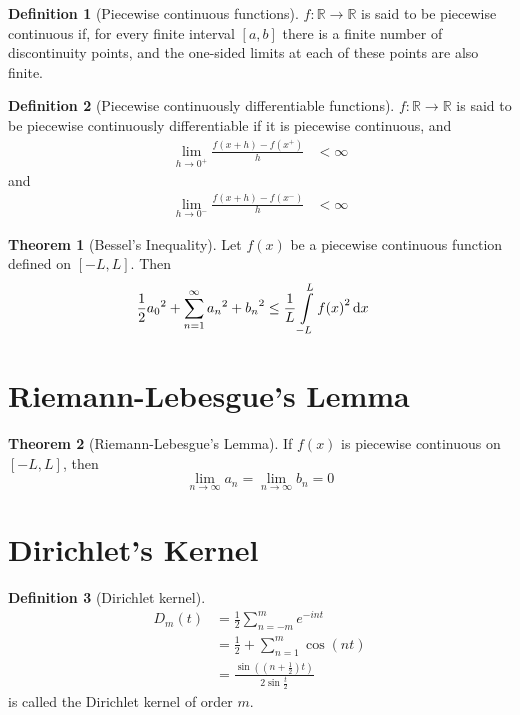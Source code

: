 \documentclass[fleqn, a4paper, 12pt, twoside]{article}
\theoremstyle{definition}
\newtheorem{definition}{Definition}
\theoremstyle{theorem}
\newtheorem{theorem}{Theorem}
\begin{document}
\begin{definition}[Piecewise continuous functions]
	$f : \mathbb{R} \to \mathbb{R}$ is said to be piecewise continuous if, for every finite interval $[a,b]$ there is a finite number of discontinuity points, and the one-sided limits at each of these points are also finite.
\end{definition}

\begin{definition}[Piecewise continuously differentiable functions]
	$f : \mathbb{R} \to \mathbb{R}$ is said to be piecewise continuously differentiable if it is piecewise continuous, and
	\begin{align*}
		\lim\limits_{h \to 0^+} \frac{f(x + h) - f(x^+)}{h} & < \infty
	\end{align*}
	and
	\begin{align*}
		\lim\limits_{h \to 0^-} \frac{f(x + h) - f(x^-)}{h} & < \infty
	\end{align*}
\end{definition}

\begin{theorem}[Bessel's Inequality]
	Let $f(x)$ be a piecewise continuous function defined on $[-L,L]$.
	Then
	\begin{align*}
		\frac{1}{2} {a_0}^2 + \sum\limits_{n = 1}^{\infty} {a_n}^2 + {b_n}^2 & \le \frac{1}{L} \int\limits_{-L}^{L} {f(x)}^2 \dif x
	\end{align*}
	\label{Bessel's_Inequality}
\end{theorem}

\section{Riemann-Lebesgue's Lemma}

\begin{theorem}[Riemann-Lebesgue's Lemma]
	If $f(x)$ is piecewise continuous on $[-L,L]$, then
	\begin{equation*}
		\lim\limits_{n \to \infty} a_n = \lim\limits_{n \to \infty} b_n = 0
	\end{equation*}
	\label{Riemann-Lebesgue's_Lemma}
\end{theorem}

\section{Dirichlet's Kernel}

\begin{definition}[Dirichlet kernel]
	\begin{align*}
		D_m(t) & = \frac{1}{2} \sum\limits_{n = -m}^{m} e^{-i n t} \\
                       & = \frac{1}{2} + \sum\limits_{n = 1}^{m} \cos(n t) \\
                       & = \frac{\sin\left( \left( n + \frac{1}{2} \right) t \right)}{2 \sin \frac{t}{2}}
	\end{align*}
	is called the Dirichlet kernel of order $m$.
\end{definition}
\end{document}
